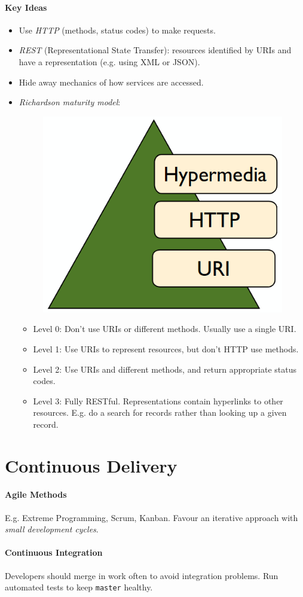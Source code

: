 \documentclass[twocolumn,english]{article}
\begin{document}
\paragraph{Key Ideas}
\begin{itemize}
\item Use \emph{HTTP} (methods, status codes) to make requests.
\item \emph{REST} (Representational State Transfer): resources identified
by URIs and have a representation (e.g. using XML or JSON).
\item Hide away mechanics of how services are accessed.
\item \emph{Richardson maturity model}:
\begin{figure}[H]
\centering{}\includegraphics[width=0.25\columnwidth]{img/rmm}
\end{figure}
\begin{itemize}
\item Level 0: Don't use URIs or different methods. Usually use a single
URI.
\item Level 1: Use URIs to represent resources, but don't HTTP use methods.
\item Level 2: Use URIs and different methods, and return appropriate status
codes.
\item Level 3: Fully RESTful. Representations contain hyperlinks to other
resources. E.g. do a search for records rather than looking up a given
record.
\end{itemize}
\end{itemize}

\section{Continuous Delivery}

\paragraph{Agile Methods}

E.g. Extreme Programming, Scrum, Kanban. Favour an iterative approach
with \emph{small development cycles}.

\paragraph{Continuous Integration}

Developers should merge in work often to avoid integration problems.
Run automated tests to keep \texttt{master} healthy.
\end{document}
